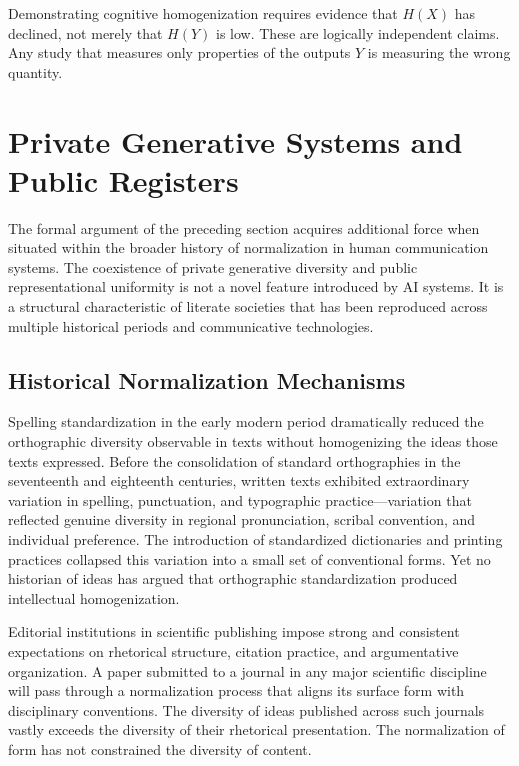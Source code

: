 \documentclass[12pt,a4paper]{article}
\theoremstyle{definition}
\theoremstyle{plain}
\theoremstyle{remark}
\begin{document}
Demonstrating cognitive homogenization requires evidence that $H(X)$ has declined, not merely
that $H(Y)$ is low. These are logically independent claims. Any study that measures only
properties of the outputs $Y$ is measuring the wrong quantity.

\section{Private Generative Systems and Public Registers}
\label{sec:private}

The formal argument of the preceding section acquires additional force when situated within
the broader history of normalization in human communication systems. The coexistence of
private generative diversity and public representational uniformity is not a novel feature
introduced by AI systems. It is a structural characteristic of literate societies that has
been reproduced across multiple historical periods and communicative technologies.

\subsection{Historical Normalization Mechanisms}

Spelling standardization in the early modern period dramatically reduced the orthographic
diversity observable in texts without homogenizing the ideas those texts expressed. Before
the consolidation of standard orthographies in the seventeenth and eighteenth centuries,
written texts exhibited extraordinary variation in spelling, punctuation, and typographic
practice---variation that reflected genuine diversity in regional pronunciation, scribal
convention, and individual preference. The introduction of standardized dictionaries and
printing practices collapsed this variation into a small set of conventional forms. Yet no
historian of ideas has argued that orthographic standardization produced intellectual
homogenization.

Editorial institutions in scientific publishing impose strong and consistent expectations on
rhetorical structure, citation practice, and argumentative organization. A paper submitted to
a journal in any major scientific discipline will pass through a normalization process that
aligns its surface form with disciplinary conventions. The diversity of ideas published
across such journals vastly exceeds the diversity of their rhetorical presentation. The
normalization of form has not constrained the diversity of content.
\end{document}
